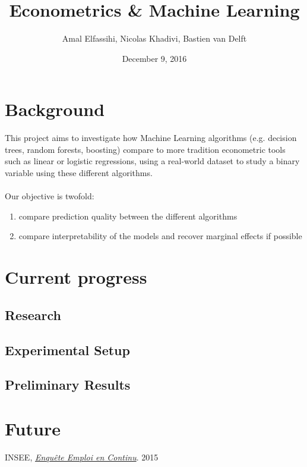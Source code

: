 \documentclass[a4paper]{article}
\begin{document}
\title{Econometrics \& Machine Learning}
\author{Amal Elfassihi, Nicolas Khadivi, Bastien van Delft}
\date{December 9, 2016}
\maketitle

\section{Background}

This project aims to investigate how Machine Learning algorithms (e.g. decision trees, random
forests, boosting) compare to more tradition econometric tools such as linear or logistic
regressions, using a real-world dataset \cite{enquete} to study a binary variable using these
different algorithms.\\
\\
Our objective is twofold:
\begin{enumerate}[nosep]
    \item compare prediction quality between the different algorithms
    \item compare interpretability of the models and recover marginal effects if possible
\end{enumerate}

\section{Current progress}
\subsection{Research}
\subsection{Experimental Setup}
\subsection{Preliminary Results}

\section{Future}
\clearpage
\begin{thebibliography}{9}
        INSEE,
        \href{https://www.insee.fr/fr/statistiques/2388681}{\emph{Enqu\^ete Emploi en Continu}}.
        2015
\end{thebibliography}
\end{document}
